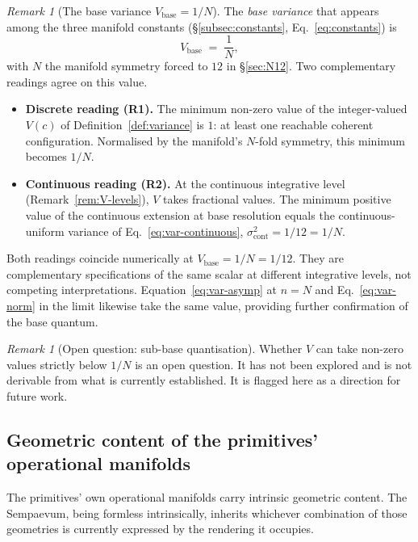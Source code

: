 \documentclass[11pt,a4paper]{article}
\theoremstyle{definition}
\theoremstyle{remark}
\newtheorem{remark}[theorem]{Remark}
\begin{document}
\begin{remark}[The base variance $V_{\text{base}} = 1/N$]\label{rem:V-base}
The \emph{base variance} that appears among the three manifold constants (\S\ref{subsec:constants}, Eq.~\eqref{eq:constants}) is
\[
V_{\text{base}} \;=\; \frac{1}{N},
\]
with $N$ the manifold symmetry forced to $12$ in \S\ref{sec:N12}. Two complementary readings agree on this value.

\begin{itemize}[leftmargin=*]
\item \textbf{Discrete reading (R1).} The minimum non-zero value of the integer-valued $V(c)$ of Definition~\ref{def:variance} is $1$: at least one reachable coherent configuration. Normalised by the manifold's $N$-fold symmetry, this minimum becomes $1/N$.

\item \textbf{Continuous reading (R2).} At the continuous integrative level (Remark~\ref{rem:V-levels}), $V$ takes fractional values. The minimum positive value of the continuous extension at base resolution equals the continuous-uniform variance of Eq.~\eqref{eq:var-continuous}, $\sigma^{2}_{\text{cont}} = 1/12 = 1/N$.
\end{itemize}

Both readings coincide numerically at $V_{\text{base}} = 1/N = 1/12$. They are complementary specifications of the same scalar at different integrative levels, not competing interpretations. Equation~\eqref{eq:var-asymp} at $n=N$ and Eq.~\eqref{eq:var-norm} in the limit likewise take the same value, providing further confirmation of the base quantum.
\end{remark}

\begin{remark}[Open question: sub-base quantisation]\label{rem:subbase-open}
Whether $V$ can take non-zero values strictly below $1/N$ is an open question. It has not been explored and is not derivable from what is currently established. It is flagged here as a direction for future work.
\end{remark}

\subsection{Geometric content of the primitives' operational manifolds}\label{subsec:geometries}

The primitives' own operational manifolds carry intrinsic geometric content. The Sempaevum, being formless intrinsically, inherits whichever combination of those geometries is currently expressed by the rendering it occupies.
\end{document}
